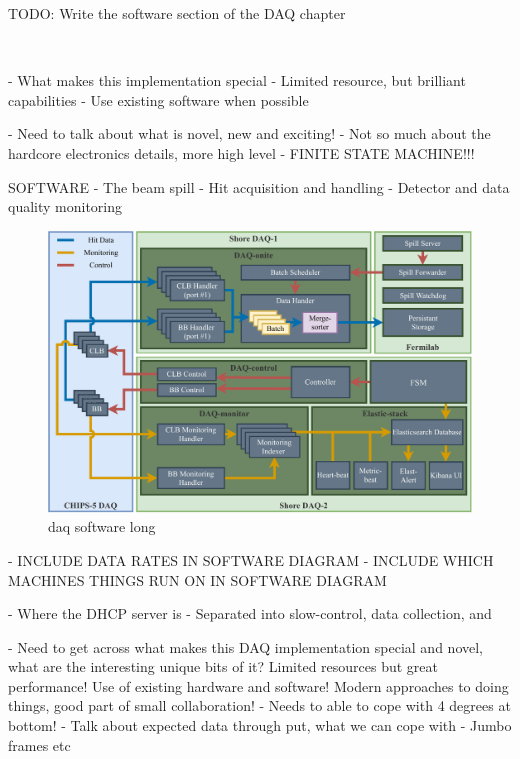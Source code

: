 TODO: Write the software section of the DAQ chapter

~\cite{chipsdaq2020}

- What makes this implementation special
- Limited resource, but brilliant capabilities
- Use existing software when possible

- Need to talk about what is novel, new and exciting!
- Not so much about the hardcore electronics details, more high level
- FINITE STATE MACHINE!!!

SOFTWARE
- The beam spill
- Hit acquisition and handling
- Detector and data quality monitoring

\begin{figure} %
    \includegraphics[width=\textwidth]{diagrams/5-daq/daq_software.pdf}
    \caption[daq software short]
    {daq software long}
    \label{fig:daq_software}
\end{figure}

- INCLUDE DATA RATES IN SOFTWARE DIAGRAM
- INCLUDE WHICH MACHINES THINGS RUN ON IN SOFTWARE DIAGRAM

- Where the DHCP server is
- Separated into slow-control, data collection, and

- Need to get across what makes this DAQ implementation special and novel, what are the
interesting unique bits of it? Limited resources but great performance! Use of existing hardware
and software! Modern approaches to doing things, good part of small collaboration!
- Needs to able to cope with 4 degrees at bottom!
- Talk about expected data through put, what we can cope with
- Jumbo frames etc

